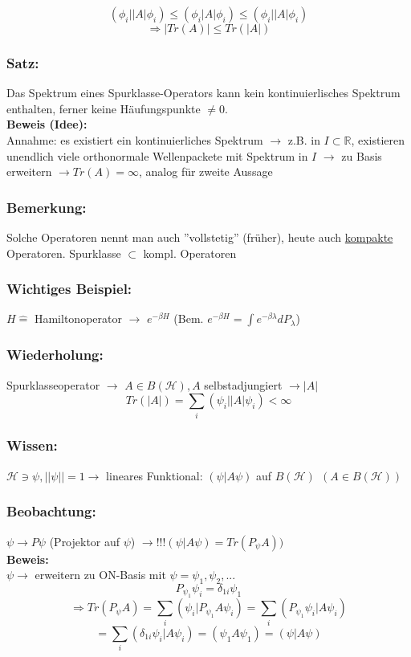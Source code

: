 \documentclass[twoside,a4paper]{scrartcl}
\newcommand{\R}{\mathbb{R}}
\renewcommand{\1}{\mathds{1}}
\newcommand{\Ra}{\Rightarrow}
\newcommand{\ra}{\rightarrow}
\renewcommand{\l}{\lambda}
\renewcommand{\H}{\mathcal{H}}
\renewcommand{\R}{\mathbb{R}}
\begin{document}
$$(\phi_i| |A| \phi_i) \leq (\phi_i|A|\phi_i)\leq (\phi_i ||A| \phi_i)$$
$$\Ra |Tr(A)| \leq Tr(|A|)$$

\subsubsection*{Satz:}
Das Spektrum eines Spurklasse-Operators kann kein kontinuierlisches Spektrum enthalten, ferner keine Häufungspunkte $\neq 0$.\\
\textbf{Beweis (Idee):}\\
Annahme: es existiert ein kontinuierliches Spektrum $\ra$ z.B. in $I \subset \R$, existieren unendlich viele orthonormale Wellenpackete mit Spektrum in $I$ $\ra$ zu Basis erweitern $\ra Tr(A)=\infty$, analog für zweite Aussage
\subsubsection*{Bemerkung:}
Solche Operatoren nennt man auch ''vollstetig'' (früher), heute auch \underline{kompakte} Operatoren. Spurklasse $\subset$ kompl. Operatoren

\subsubsection*{Wichtiges Beispiel:}
$H \mathrel{\widehat{=}} $ Hamiltonoperator $\ra$ $e^{-\beta H}$ (Bem. $e^{-\beta H}=\int e^{-\beta \l}dP_\l$)

\subsubsection*{Wiederholung:}
Spurklasseoperator $\ra$ $A\in B(\H), A $ selbstadjungiert $\ra |A|$\\
$$Tr(|A|)=\sum_i (\psi_i||A|\psi_i)< \infty$$
\subsubsection*{Wissen:}
$\H \ni \psi, ||\psi||=1 \ra$ lineares Funktional: $(\psi|A\psi)$ auf $B(\H)\ \ (A\in B(\H))$
\subsubsection*{Beobachtung:}
$\psi \ra P\psi$ (Projektor auf $\psi$) $\ra !!! (\psi|A\psi)=Tr(P_\psi A))$\\
\textbf{Beweis:}\\
$\psi \ra$ erweitern zu ON-Basis mit $\psi=\psi_1, \psi_2,...$ \\
$$P_{\psi_1}\psi_i=\delta_{1i}\psi_1$$
$$\Ra Tr(P_\psi A)=\sum_i (\psi_i|P_{\psi_1}A\psi_i)=\sum_i (P_{\psi_1}\psi_i|A\psi_i)$$
$$=\sum_i (\delta_{1i}\psi_i|A\psi_i)=(\psi_1A\psi_1)=(\psi|A\psi)$$
\end{document}
